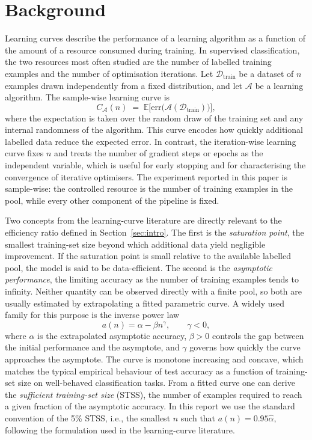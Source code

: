 \documentclass{article}
\begin{document}
\section{Background}
\label{sec:background}

Learning curves describe the performance of a learning algorithm as a function of the amount of a resource consumed during training. In supervised classification, the two resources most often studied are the number of labelled training examples and the number of optimisation iterations. Let \(\mathcal{D}_{\text{train}}\) be a dataset of \(n\) examples drawn independently from a fixed distribution, and let \(\mathcal{A}\) be a learning algorithm. The sample-wise learning curve is
\begin{equation}
C_{\mathcal{A}}(n) \;=\; \mathbb{E}\big[\mathrm{err}\big(\mathcal{A}(\mathcal{D}_{\text{train}})\big)\big],
\end{equation}
where the expectation is taken over the random draw of the training set and any internal randomness of the algorithm. This curve encodes how quickly additional labelled data reduce the expected error. In contrast, the iteration-wise learning curve fixes \(n\) and treats the number of gradient steps or epochs as the independent variable, which is useful for early stopping and for characterising the convergence of iterative optimisers. The experiment reported in this paper is sample-wise: the controlled resource is the number of training examples in the pool, while every other component of the pipeline is fixed.

Two concepts from the learning-curve literature are directly relevant to the efficiency ratio defined in Section~\ref{sec:intro}. The first is the \emph{saturation point}, the smallest training-set size beyond which additional data yield negligible improvement. If the saturation point is small relative to the available labelled pool, the model is said to be data-efficient. The second is the \emph{asymptotic performance}, the limiting accuracy as the number of training examples tends to infinity. Neither quantity can be observed directly with a finite pool, so both are usually estimated by extrapolating a fitted parametric curve. A widely used family for this purpose is the inverse power law
\begin{equation}
a(n) = \alpha - \beta n^{\gamma}, \qquad \gamma < 0,
\end{equation}
where \(\alpha\) is the extrapolated asymptotic accuracy, \(\beta > 0\) controls the gap between the initial performance and the asymptote, and \(\gamma\) governs how quickly the curve approaches the asymptote. The curve is monotone increasing and concave, which matches the typical empirical behaviour of test accuracy as a function of training-set size on well-behaved classification tasks. From a fitted curve one can derive the \emph{sufficient training-set size} (STSS), the number of examples required to reach a given fraction of the asymptotic accuracy. In this report we use the standard convention of the 5\% STSS, i.e., the smallest \(n\) such that \(a(n) = 0.95 \hat{\alpha}\), following the formulation used in the learning-curve literature.
\end{document}
